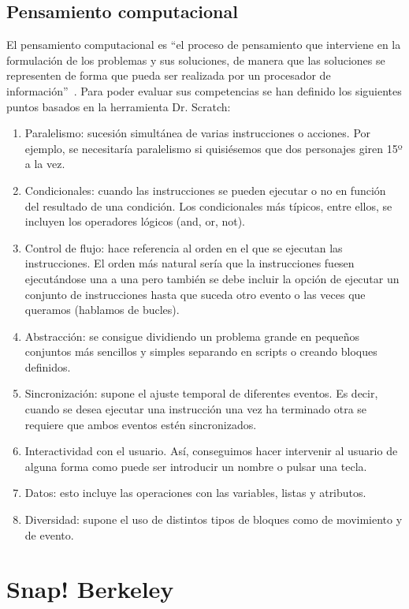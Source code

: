 \documentclass[a4paper, 12pt]{book}
\begin{document}
\subsection{Pensamiento computacional}
El pensamiento computacional es ``el proceso de pensamiento que interviene en la formulación de los problemas y sus soluciones, de manera que las soluciones se representen de forma que pueda ser realizada por un procesador de información''~\cite{wing2011research}. Para poder evaluar sus competencias se han definido los siguientes puntos basados en la herramienta Dr. Scratch:
\begin{enumerate}[1)]
    \item Paralelismo: sucesión simultánea de varias instrucciones o acciones. Por ejemplo, se necesitaría paralelismo si quisiésemos que dos personajes giren 15º a la vez.
    \item Condicionales: cuando las instrucciones se pueden ejecutar o no en función del resultado de una condición. Los condicionales más típicos, entre ellos, se incluyen los operadores lógicos (and, or, not).
    \item Control de flujo: hace referencia al orden en el que se ejecutan las instrucciones. El orden más natural sería que la instrucciones fuesen ejecutándose una a una pero también se debe incluir la opción de ejecutar un conjunto de instrucciones hasta que suceda otro evento o las veces que queramos (hablamos de bucles).
    \item Abstracción: se consigue dividiendo un problema grande en pequeños conjuntos más sencillos y simples separando en scripts o creando bloques definidos.
    \item Sincronización: supone el ajuste temporal de diferentes eventos. Es decir, cuando se desea ejecutar una instrucción una vez ha terminado otra se requiere que ambos eventos estén sincronizados.
    \item Interactividad con el usuario. Así, conseguimos hacer intervenir al usuario de alguna forma como puede ser introducir un nombre o pulsar una tecla.
    \item Datos: esto incluye las operaciones con las variables, listas y atributos.
    \item Diversidad: supone el uso de distintos tipos de bloques como de movimiento y de evento.
\end{enumerate}

\section{Snap! Berkeley}
\end{document}
